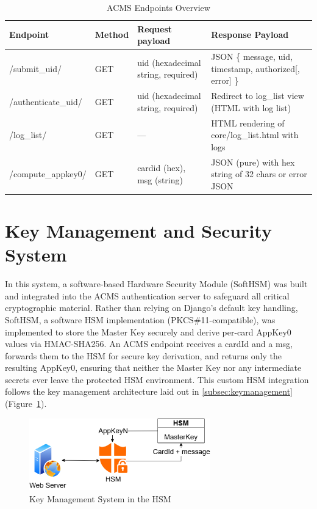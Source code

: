\begin{table}[H]

	\begin{tabular}{|l|l|p{2.5cm}|p{2.5cm}|}
		\hline
		\textbf{Endpoint} & \textbf{Method} & \textbf{Request payload} & \textbf{Response Payload} \\ \hline
		/submit\_uid/ & GET & uid (hexadecimal string, required) & JSON \{ message, uid, timestamp, authorized[, error] \} \\ \hline
		/authenticate\_uid/ & GET & uid (hexadecimal string, required) & Redirect to log\_list view (HTML with log list) \\ \hline
		/log\_list/ & GET & --- & HTML rendering of core/log\_list.html with logs \\ \hline
		/compute\_appkey0/ & GET & cardid (hex), msg (string) & JSON (pure) with hex string of 32 chars or error JSON \\ \hline
	\end{tabular}
	\caption{ACMS Endpoints Overview}
	\label{tab:endpoints}
\end{table}

\section{Key Management and Security System}
In this system, a software-based Hardware Security Module (SoftHSM) was built and integrated into the ACMS authentication server to safeguard all critical cryptographic material. Rather than relying on Django’s default key handling, SoftHSM, a software HSM implementation (PKCS\#11-compatible), was implemented to store the Master Key securely and derive per-card AppKey0 values via HMAC-SHA256. An ACMS endpoint receives a cardId and a msg, forwards them to the HSM for secure key derivation, and returns only the resulting AppKey0, ensuring that neither the Master Key nor any intermediate secrets ever leave the protected HSM environment. This custom HSM integration follows the key management architecture laid out in \ref{subsec:keymanagement} (Figure~\ref{fig:key_management}).

\begin{figure}[h]
	\centering
	\includegraphics[width=0.7\textwidth]{imaxes/KEY_MANA} %
	\caption{Key Management System in the HSM}
	\label{fig:key_management}
\end{figure}

